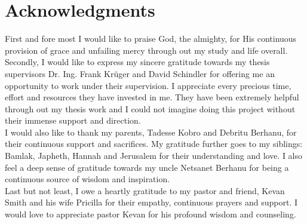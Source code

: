 
\bigskip

\begingroup
\let\clearpage\relax
\let\cleardoublepage\relax
\let\cleardoublepage\relax
\chapter*{Acknowledgments}

First and fore most I would like to praise God, the almighty, for His continuous provision of grace and unfailing mercy through out my study and life overall. \\

Secondly, I would like to express my sincere gratitude towards my thesis supervisors Dr. Ing. Frank Krüger and David Schindler for offering me an opportunity to work under their supervision. I appreciate every precious time, effort and resources they have invested in me. They have been extremely  helpful through out my thesis work and I could not imagine doing this project without their immense support and direction. \\

I would also like to thank my parents, Tadesse Kobro and Debritu Berhanu, for their continuous support and sacrifices. My gratitude further goes to my siblings: Bamlak, Japheth, Hannah and Jerusalem for their understanding and love.   I also feel a deep sense of gratitude towards my uncle Netsanet Berhanu for being a continuous source of wisdom and inspiration. \\

Last but not least, I owe a heartly gratitude to my pastor and friend, Kevan Smith and his wife Pricilla for their empathy, continuous prayers and support.  I would love to appreciate pastor Kevan for his profound wisdom and counseling. 



\bigskip


\endgroup



